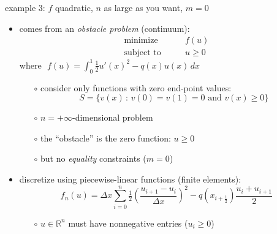 \documentclass[10pt,hyperref,dvipsnames]{beamer}
\newcommand{\RR}{\mathbb{R}}
\newcommand{\ds}{\displaystyle}
\begin{document}
\begin{frame}{example 3: $f$ quadratic, $n$ as large as you want, $m=0$}

\begin{itemize}
\item comes from an \emph{obstacle problem} (continuum):
\begin{equation*}
\begin{matrix}
\text{minimize} \qquad & f(u) \\
\text{subject to} \qquad & u \ge 0
\end{matrix}
\end{equation*}
where \,\,$\ds f(u) = \int_0^1 \tfrac{1}{2} u'(x)^2 - q(x) u(x)\,dx$

    \begin{itemize}
    \item[$\circ$] consider only functions with zero end-point values:
    	$$S = \{v(x)\,:\, v(0)=v(1)=0 \text{ and } v(x) \ge 0\}$$
    \item[$\circ$] $n=+\infty$-dimensional problem
    \item[$\circ$] the ``obstacle'' is the zero function: $u\ge 0$
    \item[$\circ$] but no \emph{equality} constraints ($m=0$)
    \end{itemize}
\item discretize using piecewise-linear functions (finite elements):
\begin{equation*}
    f_n(u) = \Delta x \sum_{i=0}^n \tfrac{1}{2}\left(\frac{u_{i+1}-u_i}{\Delta x}\right)^2 - q(x_{i+\frac{1}{2}}) \frac{u_i + u_{i+1}}{2}
\end{equation*}

    \begin{itemize}
    \item[$\circ$] $u\in\RR^n$ must have nonnegative entries ($u_i\ge 0$)
    \end{itemize}
\end{itemize}
\end{frame}
\end{document}
